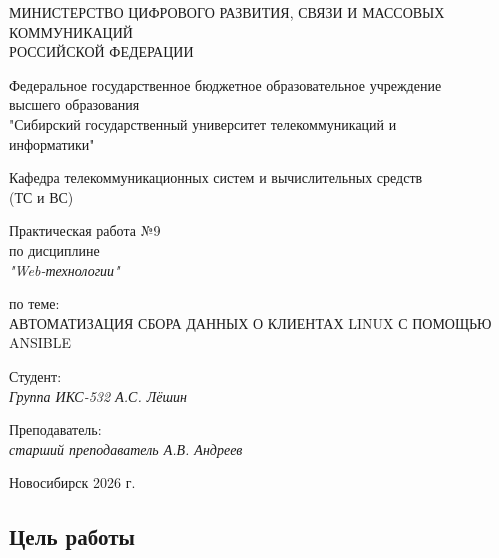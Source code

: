 \documentclass[a4paper,14pt,oneside,openany]{memoir}
\begin{document}
\thispagestyle{empty}

\begin{center}
    МИНИСТЕРСТВО ЦИФРОВОГО РАЗВИТИЯ, СВЯЗИ И МАССОВЫХ \\ КОММУНИКАЦИЙ \\ РОССИЙСКОЙ ФЕДЕРАЦИИ

    \vspace{20pt}

    Федеральное государственное бюджетное образовательное учреждение \\ высшего образования \\
    "Сибирский государственный университет телекоммуникаций и \\ информатики"

    \vspace{20pt}

    Кафедра телекоммуникационных систем и вычислительных средств \\ (ТС и ВС)
\end{center}

\vfill

\begin{center}
    Практическая работа №9 \\
    по дисциплине \\
    \textit{"Web-технологии"}

    \vspace{20pt}

    по теме: \\
    \uppercase{Автоматизация сбора данных о клиентах Linux с помощью Ansible}
\end{center}

\vfill

\noindent Студент: \\
\textit{Группа ИКС-532 \hfill А.С. Лёшин}

\vspace{20pt}

\noindent Преподаватель: \\
\textit{старший преподаватель \hfill А.В. Андреев}

\vfill

\begin{center}
    Новосибирск 2026 г.
\end{center}

\newpage
\setcounter{page}{2}
\OnehalfSpacing*

\subsection*{Цель работы}
\end{document}
